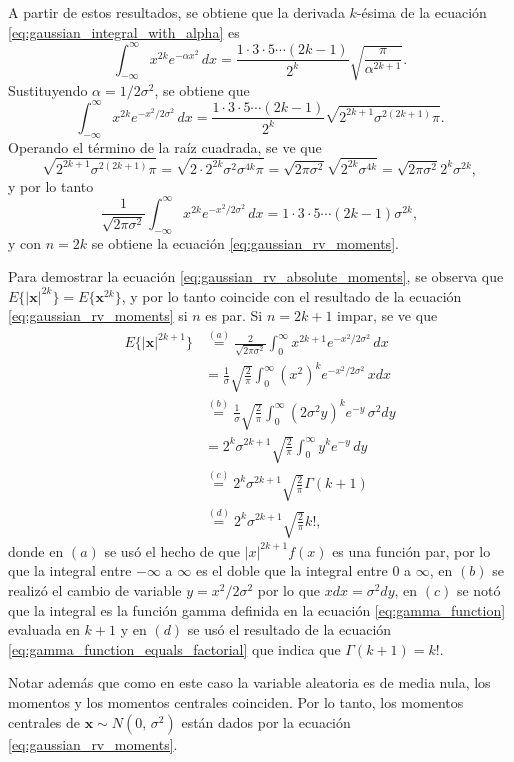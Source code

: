 \documentclass[a4paper]{report}
\newcommand{\x}{\mathbf{x}}
\begin{document}
A partir de estos resultados, se obtiene que la derivada \(k\)-ésima de la ecuación \ref{eq:gaussian_integral_with_alpha} es
\[
 \int_{-\infty}^{\infty}x^{2k}e^{-\alpha x^2}\,dx=\dfrac{1\cdot 3\cdot 5\cdots(2k-1)}{2^k}\sqrt{\dfrac{\pi}{\alpha^{2k+1}}}.
\]
Sustituyendo \(\alpha=1/2\sigma^2\), se obtiene que
\[
 \int_{-\infty}^{\infty}x^{2k}e^{-x^2/2\sigma^2}\,dx=\dfrac{1\cdot 3\cdot 5\cdots(2k-1)}{2^k}\sqrt{2^{2k+1}\sigma^{2(2k+1)}\pi}.
\]
Operando el término de la raíz cuadrada, se ve que
\[
 \sqrt{2^{2k+1}\sigma^{2(2k+1)}\pi}=\sqrt{2\cdot2^{2k}\sigma^{2}\sigma^{4k}\pi}
 =\sqrt{2\pi\sigma^{2}}\sqrt{2^{2k}\sigma^{4k}}=\sqrt{2\pi\sigma^{2}}2^{k}\sigma^{2k},
\]
y por lo tanto
\[
 \frac{1}{\sqrt{2\pi\sigma^{2}}}\int_{-\infty}^{\infty}x^{2k}e^{-x^2/2\sigma^2}\,dx =1\cdot 3\cdot 5\cdots(2k-1)\sigma^{2k},
\]
y con \(n=2k\) se obtiene la ecuación \ref{eq:gaussian_rv_moments}.

Para demostrar la ecuación \ref{eq:gaussian_rv_absolute_moments}, se observa que \(E\{|\x|^{2k}\}=E\{\x^{2k}\}\), y por lo tanto coincide con el resultado de la ecuación \ref{eq:gaussian_rv_moments} si \(n\) es par. Si \(n=2k+1\) impar, se ve que
\begin{align*}
 E\{|\x|^{2k+1}\}&\overset{(a)}{=}\frac{2}{\sqrt{2\pi\sigma^{2}}}\int_{0}^{\infty}x^{2k+1}e^{-x^2/2\sigma^2}\,dx\\
   &=\frac{1}{\sigma}\sqrt{\frac{2}{\pi}}\int_{0}^{\infty}(x^{2})^{k}e^{-x^2/2\sigma^2}\,xdx\\
   &\overset{(b)}{=}\frac{1}{\sigma}\sqrt{\frac{2}{\pi}}
   \int_{0}^{\infty}\left(2\sigma^2y\right)^ke^{-y}\,\sigma^2dy\\
   &=2^k\sigma^{2k+1}\sqrt{\frac{2}{\pi}}\int_{0}^{\infty}y^ke^{-y}\,dy\\
   &\overset{(c)}{=}2^k\sigma^{2k+1}\sqrt{\frac{2}{\pi}}\Gamma(k+1)\\
   &\overset{(d)}{=}2^k\sigma^{2k+1}\sqrt{\frac{2}{\pi}}k!,
\end{align*}
donde en \((a)\) se usó el hecho de que \(|x|^{2k+1}f(x)\) es una función par, por lo que la integral entre \(-\infty\) a \(\infty\) es el doble que la integral entre 0 a \(\infty\), en \((b)\) se realizó el cambio de variable \(y=x^2/2\sigma^2\) por lo que \(xdx=\sigma^2dy\), en \((c)\) se notó que la integral es la función gamma definida en la ecuación \ref{eq:gamma_function} evaluada en \(k+1\) y en \((d)\) se usó el resultado de la ecuación \ref{eq:gamma_function_equals_factorial} que indica que \(\Gamma(k+1)=k!\).

Notar además que como en este caso la variable aleatoria es de media nula, los momentos y los momentos centrales coinciden. Por lo tanto, los momentos centrales de \(\x\sim N(0,\,\sigma^2)\) están dados por la ecuación \ref{eq:gaussian_rv_moments}. 
\end{document}
